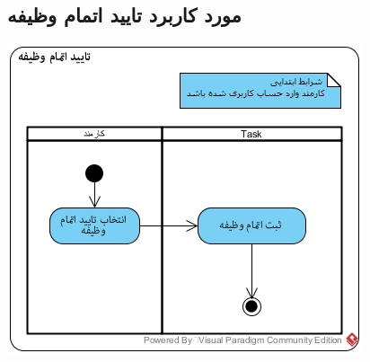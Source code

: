 \subsection*{مورد کاربرد تایید اتمام وظیفه}
\vspace{2cm}
\begin{center}
\includegraphics[width=\textwidth]{ActivityDiagramsWithSwimlanes/30.jpg}
\end{center}

\newpage
\vspace{2cm}
